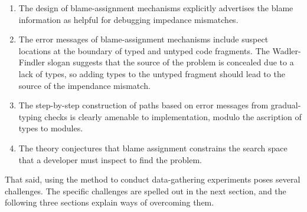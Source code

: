 \begin{enumerate}

\item The design of blame-assignment mechanisms explicitly advertises the blame
information as helpful for debugging impedance mismatches.

\item The error messages of blame-assignment mechanisms include suspect
locations at the boundary of typed and untyped code fragments.
The Wadler-Findler slogan suggests that the source of the problem is concealed due to a lack of types, so
adding types to the untyped fragment should lead to the source of the impendance mismatch.

\item The step-by-step construction of paths based on error messages from
gradual-typing checks is clearly amenable to implementation, modulo the
ascription of types to modules.

\item The theory conjectures that blame assignment constrains the search
space that a developer must inspect to find the problem.

\end{enumerate}
That said, using the method to conduct data-gathering experiments poses
several challenges. The specific challenges are spelled out in the next section,
and the following three sections explain ways of overcoming them.
